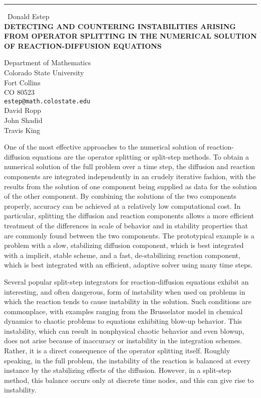 \documentclass{report}
\begin{document}
\begin{center}
\rule{6in}{1pt} \
{\large Donald Estep \\
{\bf DETECTING AND COUNTERING INSTABILITIES ARISING FROM OPERATOR SPLITTING IN THE NUMERICAL SOLUTION OF REACTION-DIFFUSION EQUATIONS}}

Department of Mathematics \\ Colorado State University \\ Fort Collins \\ CO  80523
\\
{\tt estep@math.colostate.edu}\\
David Ropp\\
John Shadid\\
	Travis King\end{center}

One of the most effective approaches to the numerical solution of
reaction-diffusion equations are the operator splitting or split-step
methods. To obtain a numerical solution of the full problem over a time
step, the diffusion and reaction components are integrated independently
in an crudely iterative fashion, with the results from the solution of
one component being supplied as data for the solution of the other
component. By combining the solutions of the two components properly,
accuracy can be achieved at a relatively low computational cost. In
particular, splitting the diffusion and reaction components allows a more
efficient treatment of the differences in scale of behavior and in
stability properties that are commonly found between the two components.
The prototypical example is a problem with a slow, stabilizing diffusion
component, which is best integrated with a implicit, stable scheme, and a
fast, de-stabilizing reaction component, which is best integrated with an
efficient, adaptive solver using
many time steps.

Several popular split-step integrators for reaction-diffusion
equations exhibit an interesting, and often dangerous, form of
instability when used on problems in which the reaction tends to cause
instability in the solution. Such conditions are
commonplace, with examples ranging from the Brusselator model in chemical
dynamics to chaotic problems to equations exhibiting blow-up behavior.
This instability, which can result in nonphysical chaotic behavior and
even blowup, does not arise
because of inaccuracy or instability in the integration schemes. Rather,
it is a direct consequence of the operator splitting itself. Roughly
speaking, in the full problem, the instability of the reaction is
balanced at every instance by the stabilizing effects of the diffusion.
However, in a split-step method, this balance occurs only at discrete
time nodes, and this can give rise to instability.
\end{document}
